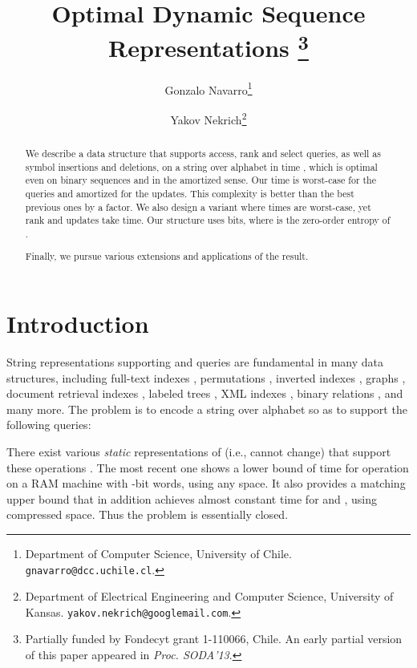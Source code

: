 \documentclass[11pt]{article}
\newcommand{\no}[1]{}
\begin{document}
\title{\Large Optimal Dynamic Sequence Representations
\thanks{Partially funded by Fondecyt grant 1-110066, Chile.
An early partial version of this paper appeared in {\em Proc. SODA'13}.}}

\author{
Gonzalo Navarro\thanks{Department of Computer Science, University of Chile.
{\tt  gnavarro@dcc.uchile.cl}.}
\and
Yakov Nekrich\thanks{Department of Electrical Engineering and Computer Science,
University of Kansas.
{\tt yakov.nekrich@googlemail.com}.}
}
\date{}

\maketitle

\begin{abstract} 
We describe a data structure that supports access, rank and select queries,
as well as symbol insertions and deletions, on a string  over alphabet 
 in time , which is optimal even on binary
sequences and in the amortized sense. Our time is worst-case for the queries 
and amortized for the updates. This complexity is better than the best previous
ones by a  factor.
We also design a variant where times are worst-case, yet rank and updates
take  time.
Our structure uses 
bits, where  is the zero-order entropy of .
\no{Finally, we pursue various extensions, like handling general alphabets
(such as reals and strings) and supporting a more general algebra of string
operations including concatenations, splits, and block edits.}
Finally, we pursue various extensions and applications of the
result.
\end{abstract}

\section{Introduction}
\label{sec:intro}

String representations supporting  and  queries are fundamental
in many data structures, including 
full-text indexes \cite{GGV03,FMMN07,GMR06}, 
permutations \cite{GMR06,BGNN10}, 
inverted indexes \cite{BFLN08,BGNN10}, 
graphs \cite{CN10},
document retrieval indexes \cite{VM07}, 
labeled trees \cite{GMR06,BHMR07}, 
XML indexes \cite{GHSV07,FLMM09},
binary relations \cite{BHMR07}, 
and many more. 
The problem is to encode a string  over alphabet  
so as to support the following queries:


There exist various {\em static} representations of  (i.e.,  cannot change) that support these 
operations \cite{GGV03,GMR06,FMMN07,BGNN10,BN12}. The most recent one
\cite{BN12} shows a lower bound of  time
for operation  on a RAM machine with -bit words, using any
 space. It also provides a matching upper bound that in addition 
achieves almost constant time for  and , using compressed space. 
Thus the problem is essentially closed.
\end{document}
